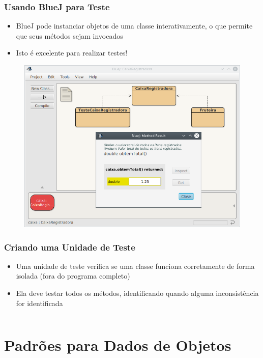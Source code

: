 \documentclass[xcolor={dvipsnames,table},aspectratio=169]{beamer}
\begin{document}
\begin{frame}[fragile]\frametitle{Usando BlueJ para Teste}
\begin{itemize}
	\item BlueJ pode instanciar objetos de uma classe interativamente, o que permite que seus métodos sejam invocados
	\item Isto é excelente para realizar testes!
\end{itemize}
\begin{figure}[h]
	\includegraphics[height=0.55\paperheight,center]{pucrs-ep-fprog-unidade_07-objetos_e_classes-laminas-bluej.jpg}
\end{figure}
\end{frame}

\begin{frame}[fragile]\frametitle{Criando uma Unidade de Teste}
\begin{itemize}
	\item Uma unidade de teste verifica se uma classe funciona corretamente de forma isolada (fora do programa completo)
	\item Ela deve testar todos os métodos, identificando quando alguma inconsistência for identificada
{\tiny\inputminted[bgcolor=cyan!10]{java}{src/caixa2/TestaCaixaRegistradora.java}}
\end{itemize}
\end{frame}

\section{Padrões para Dados de Objetos}
\end{document}

